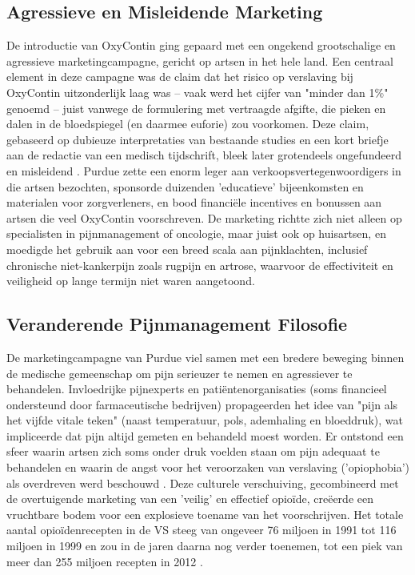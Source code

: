 \documentclass[11pt, a4paper]{report} %
\begin{document}
\subsection{Agressieve en Misleidende Marketing}
De introductie van OxyContin ging gepaard met een ongekend grootschalige en agressieve marketingcampagne, gericht op artsen in het hele land. Een centraal element in deze campagne was de claim dat het risico op verslaving bij OxyContin uitzonderlijk laag was – vaak werd het cijfer van "minder dan 1\%" genoemd – juist vanwege de formulering met vertraagde afgifte, die pieken en dalen in de bloedspiegel (en daarmee euforie) zou voorkomen. Deze claim, gebaseerd op dubieuze interpretaties van bestaande studies en een kort briefje aan de redactie van een medisch tijdschrift, bleek later grotendeels ongefundeerd en misleidend \parencite{JusticeDeptPurdueResolution, HealthlineDopesickTruth}. Purdue zette een enorm leger aan verkoopsvertegenwoordigers in die artsen bezochten, sponsorde duizenden 'educatieve' bijeenkomsten en materialen voor zorgverleners, en bood financiële incentives en bonussen aan artsen die veel OxyContin voorschreven. De marketing richtte zich niet alleen op specialisten in pijnmanagement of oncologie, maar juist ook op huisartsen, en moedigde het gebruik aan voor een breed scala aan pijnklachten, inclusief chronische niet-kankerpijn zoals rugpijn en artrose, waarvoor de effectiviteit en veiligheid op lange termijn niet waren aangetoond.

\subsection{Veranderende Pijnmanagement Filosofie}
De marketingcampagne van Purdue viel samen met een bredere beweging binnen de medische gemeenschap om pijn serieuzer te nemen en agressiever te behandelen. Invloedrijke pijnexperts en patiëntenorganisaties (soms financieel ondersteund door farmaceutische bedrijven) propageerden het idee van "pijn als het vijfde vitale teken" (naast temperatuur, pols, ademhaling en bloeddruk), wat impliceerde dat pijn altijd gemeten en behandeld moest worden. Er ontstond een sfeer waarin artsen zich soms onder druk voelden staan om pijn adequaat te behandelen en waarin de angst voor het veroorzaken van verslaving ('opiophobia') als overdreven werd beschouwd \parencite{Cicero2017Review}. Deze culturele verschuiving, gecombineerd met de overtuigende marketing van een 'veilig' en effectief opioïde, creëerde een vruchtbare bodem voor een explosieve toename van het voorschrijven. Het totale aantal opioïdenrecepten in de VS steeg van ongeveer 76 miljoen in 1991 tot 116 miljoen in 1999 en zou in de jaren daarna nog verder toenemen, tot een piek van meer dan 255 miljoen recepten in 2012 \parencite{HealthlineDopesickTruth, CDCUnderstandingEpidemic}.
\end{document}
